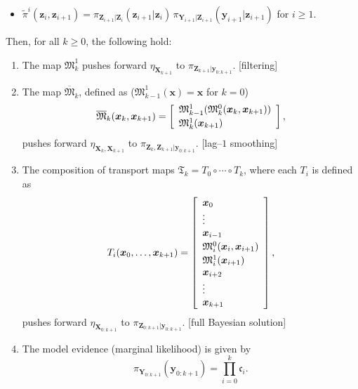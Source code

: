 \documentclass[twoside,11pt]{article}
\newcommand{\Xb}{\boldsymbol{X}}
\newcommand{\xb}{\boldsymbol{x}}
\newcommand{\Yb}{\boldsymbol{Y}}
\newcommand{\yb}{\boldsymbol{y}}
\newcommand{\Zb}{\boldsymbol{Z}}
\newcommand{\zb}{\boldsymbol{z}}
\newcommand{\submap}{\mathfrak{M}}
\begin{document}
\begin{theorem}
\begin{itemize}[label={--}]
  \item $\widetilde{\pi}^i(\zb_i, \zb_{i+1})=
     \pi_{\Zb_{i+1} \vert \Zb_i}( \zb_{i+1} \vert \zb_{i})  \,
    \pi_{\Yb_{i+1} \vert \Zb_{i+1} }(\yb_{i+1} \vert \zb_{i+1})$ for $i\ge 1$.  
\end{itemize}
%
Then, for all $k\ge 0$, the following hold: 
  \begin{enumerate}
    \item 
    \label{thm:decompSmooth:partFilt}
    The map $\submap_k^1$ pushes forward $\eta_{\Xb_{k+1}}$ to
    $\pi_{\Zb_{k+1} \vert \yb_{0:k+1}}$.
    \hfill [filtering]
    \item 
    \label{thm:decompSmooth:partSmot}
    The map $\overline{\submap}_k$, defined as ($\submap_{k-1}^1(\xb)=\xb$ for $k=0$)
    \begin{equation}    \label{eq:thm:decompSmooth:upperTriMapSmooth} 
      \overline{\submap}_k( \xb_k , \xb_{k+1} ) = \left[\begin{array}{l}
      \submap_{k-1}^1( \submap_k^0( \xb_k , \xb_{k+1} ) )\\[\spacinglines] 
      \submap_k^1(\xb_{k+1})
      \end{array}\right], %
    \end{equation}
    pushes forward 
    $\eta_{\Xb_k,\Xb_{k+1}}$ 
    to
    $\pi_{ \Zb_k ,\Zb_{k+1} \vert \yb_{0:k+1} }$. 
    \hfill
    [lag--$1$ smoothing]
    \item 
    \label{thm:decompSmooth:partFull}
    The composition of transport maps $\mathfrak{T}_k = T_0 \circ \cdots \circ T_k$,
    where each $T_i$ is defined 
    as
    \begin{equation}  \label{eq:thm:decompSmooth:upperTriMapEmb} 
    T_i( \xb_0 , \ldots, \xb_{k+1} ) = \left[\begin{array}{l}
    \xb_0 \\ 
    \vdots \\
    \xb_{i-1} \\[\spacinglines]
    \submap_i^0( \xb_i , \xb_{i+1}) \\[\spacinglines]
    \submap_i^1( \xb_{i+1}) \\
    \xb_{i+2} \\
    \vdots \\
    \xb_{k+1}
    \end{array}\right],%
    \end{equation}
    pushes forward 
    $\eta_{\Xb_{0:k+1}}$  
    to 
    $\pi_{\Zb_{0:k+1} \vert \yb_{0:k+1} }$. \hfill
    [full Bayesian solution]
    \item 
    \label{thm:decompSmooth:partEvidence}
    The model evidence (marginal likelihood) is given by 
    \begin{equation} \label{thm:decompSmooth:evidence}
    \pi_{\Yb_{0:k+1}}(\yb_{0:k+1}) 
    = \prod_{i=0}^k \mathfrak{c}_i. 
    \end{equation}    
  \end{enumerate}
\end{theorem}
\end{document}
